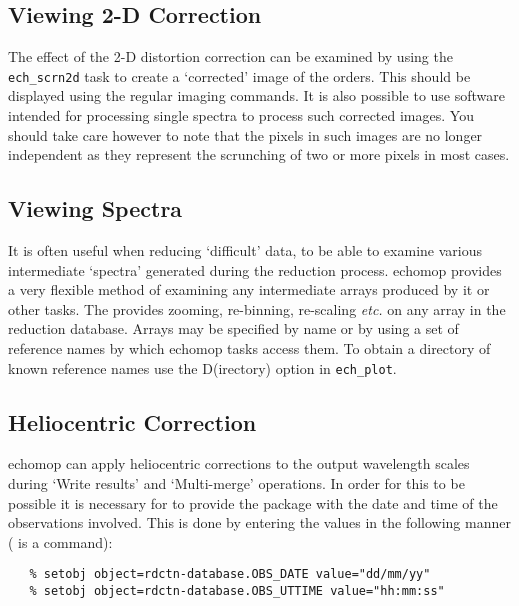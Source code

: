 \subsection{Viewing 2-D Correction}

The effect of the 2-D distortion correction can be examined by using
the \verb+ech_scrn2d+ task to create a `corrected' image of the
orders.
This should be displayed using the regular imaging commands.  It is
also possible to use software intended for processing single spectra
to process such corrected images.  You should take care
however to note that the pixels in such images are no longer
independent as they represent the scrunching of two or more pixels in
most cases. 


\subsection{Viewing Spectra}

It is often useful when reducing `difficult' data,  to be able to
examine various intermediate `spectra' generated during the reduction
process. {\sc echomop} provides a very flexible method of examining any
intermediate arrays produced by it or other tasks.  The
provides zooming, re-binning, re-scaling {\it etc.}
on any array in the reduction database.  Arrays may be specified by
name or by using a set of reference names by which {\sc echomop} tasks access
them.   To obtain a directory of known reference names
use the D(irectory) option in \verb+ech_plot+\@.


\subsection{Heliocentric Correction}

{\sc echomop} can apply heliocentric corrections to the output wavelength scales
during `Write results' and `Multi-merge' operations.
In order for this to be possible it is necessary for to provide the package
with the date and time of the observations involved.
This is done by entering the values in the
following manner ( is a
 command):

\begin{verbatim}
   % setobj object=rdctn-database.OBS_DATE value="dd/mm/yy"
   % setobj object=rdctn-database.OBS_UTTIME value="hh:mm:ss"
\end{verbatim}

